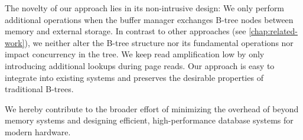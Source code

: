 The novelty of our approach lies in its non-intrusive design: 
We only perform additional operations when the buffer manager exchanges B-tree nodes between memory and external storage.
In contrast to other approaches (see \autoref{chap:related-work}), we neither alter the B-tree structure nor its fundamental operations nor impact concurrency in the tree.
We keep read amplification low by only introducing additional lookups during page reads.
Our approach is easy to integrate into existing systems and preserves the desirable properties of traditional B-trees.

We hereby contribute to the broader effort of minimizing the overhead of beyond memory systems and designing efficient, high-performance database systems for modern hardware.
